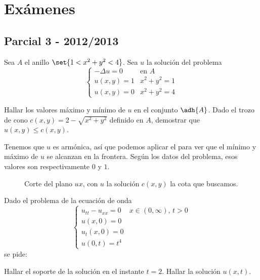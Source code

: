 \section{Exámenes}

\subsection{Parcial 3 - 2012/2013}


\begin{problem}[1] Sea $A$ el anillo $\set{1 < x^2 + y^2 < 4}$. Sea $u$ la solución del problema
\[
\begin{cases}
	- Δ u = 0 & \text{en } A \\
	u(x,y) = 1 & x^2 + y^2 = 1 \\
	u(x,y) = 0 & x^2 + y^2 = 4
\end{cases}
\]

\ppart Hallar los valores máximo y mínimo de $u$ en el conjunto $\adh{A}$.
\ppart Dado el trozo de cono $c(x,y) = 2 - \sqrt{x^2 + y^2}$ definido en $A$, demostrar que $u(x,y) ≤ c(x,y)$.

\solution

\spart

Tenemos que $u$ es armónica, así que podemos aplicar el  para ver que el mínimo y máximo de $u$ se alcanzan en la frontera. Según los datos del problema, esos valores son respectivamente $0$ y $1$.

\spart

\begin{wrapfigure}{R}[0.1\textwidth]{0.4\textwidth}
\centering
{}
\caption{Corte del plano $ux$, con $u$ la solución $c(x,y)$ la cota que buscamos.}
\label{fig:ExamenCono}
\end{wrapfigure}


\end{problem}


\begin{problem} Dado el problema de la ecuación de onda
\[
\begin{cases}
	u_{tt} - u_{xx} = 0 & x∈ (0,∞),\, t > 0\\
	u(x,0) = 0 \\
	u_t(x,0) = 0 \\
	u(0,t) = t^4
\end{cases}
\] se pide:

\ppart Hallar el soporte de la solución en el instante $t = 2$.
\ppart Hallar la solución $u(x,t)$.

\solution

\end{problem}
